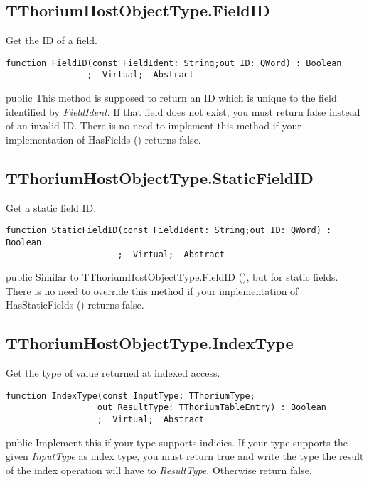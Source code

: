\subsection{TThoriumHostObjectType.FieldID}
\label{thoriumcorepkg:thorium:tthoriumhostobjecttype:fieldid}
\begin{FPCList}
\Synopsis
Get the ID of a field.\Declaration 

\begin{verbatim}
function FieldID(const FieldIdent: String;out ID: QWord) : Boolean
                ;  Virtual;  Abstract
\end{verbatim}
\Visibility
public
\Description
This method is supposed to return an ID which is unique to the field identified by \textit{FieldIdent}. If that field does not exist, you must return false instead of an invalid ID. There is no need to implement this method if your implementation of HasFields (\pageref{thoriumcorepkg:thorium:tthoriumhostobjecttype:hasfields}) returns false.\end{FPCList}
\subsection{TThoriumHostObjectType.StaticFieldID}
\label{thoriumcorepkg:thorium:tthoriumhostobjecttype:staticfieldid}
\begin{FPCList}
\Synopsis
Get a static field ID.\Declaration 

\begin{verbatim}
function StaticFieldID(const FieldIdent: String;out ID: QWord) : Boolean
                      ;  Virtual;  Abstract
\end{verbatim}
\Visibility
public
\Description
Similar to TThoriumHostObjectType.FieldID (\pageref{thoriumcorepkg:thorium:tthoriumhostobjecttype:fieldid}), but for static fields. There is no need to override this method if your implementation of HasStaticFields (\pageref{thoriumcorepkg:thorium:tthoriumhostobjecttype:hasstaticfields}) returns false.\end{FPCList}
\subsection{TThoriumHostObjectType.IndexType}
\label{thoriumcorepkg:thorium:tthoriumhostobjecttype:indextype}
\begin{FPCList}
\Synopsis
Get the type of value returned at indexed access.\Declaration 

\begin{verbatim}
function IndexType(const InputType: TThoriumType;
                  out ResultType: TThoriumTableEntry) : Boolean
                  ;  Virtual;  Abstract
\end{verbatim}
\Visibility
public
\Description
Implement this if your type supports indicies. If your type supports the given \textit{InputType} as index type, you must return true and write the type the result of the index operation will have to \textit{ResultType}. Otherwise return false.\end{FPCList}
